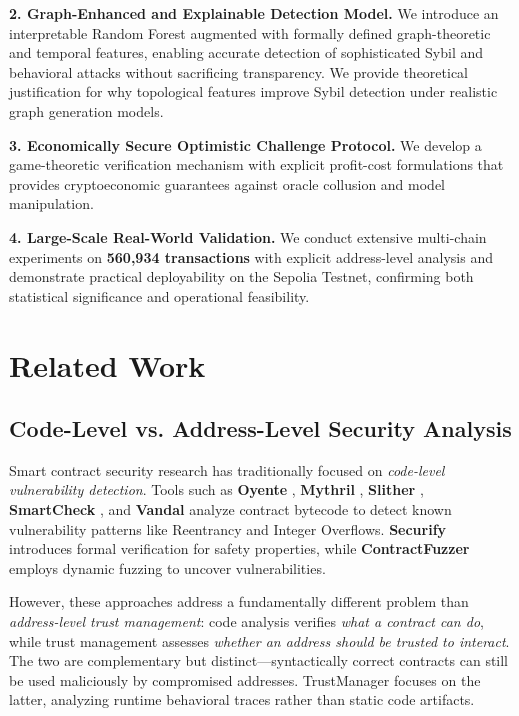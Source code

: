 \documentclass[runningheads]{llncs}
\begin{document}
\textbf{2. Graph-Enhanced and Explainable Detection Model.} We introduce an interpretable Random Forest augmented with formally defined graph-theoretic and temporal features, enabling accurate detection of sophisticated Sybil and behavioral attacks without sacrificing transparency. We provide theoretical justification for why topological features improve Sybil detection under realistic graph generation models.

\textbf{3. Economically Secure Optimistic Challenge Protocol.} We develop a game-theoretic verification mechanism with explicit profit-cost formulations that provides cryptoeconomic guarantees against oracle collusion and model manipulation.

\textbf{4. Large-Scale Real-World Validation.} We conduct extensive multi-chain experiments on \textbf{560,934 transactions} with explicit address-level analysis and demonstrate practical deployability on the Sepolia Testnet, confirming both statistical significance and operational feasibility.

\section{Related Work}

\subsection{Code-Level vs. Address-Level Security Analysis}
Smart contract security research has traditionally focused on \textit{code-level vulnerability detection}. Tools such as \textbf{Oyente} \cite{luu2016making}, \textbf{Mythril} \cite{mueller2018mythril}, \textbf{Slither} \cite{feist2019slither}, \textbf{SmartCheck} \cite{tikhomirov2018smartcheck}, and \textbf{Vandal} \cite{brent2018vandal} analyze contract bytecode to detect known vulnerability patterns like Reentrancy and Integer Overflows. \textbf{Securify} \cite{tsankov2018securify} introduces formal verification for safety properties, while \textbf{ContractFuzzer} \cite{jiang2018contractfuzzer} employs dynamic fuzzing to uncover vulnerabilities. 

However, these approaches address a fundamentally different problem than \textit{address-level trust management}: code analysis verifies \textit{what a contract can do}, while trust management assesses \textit{whether an address should be trusted to interact}. The two are complementary but distinct—syntactically correct contracts can still be used maliciously by compromised addresses. TrustManager focuses on the latter, analyzing runtime behavioral traces rather than static code artifacts.
\end{document}
